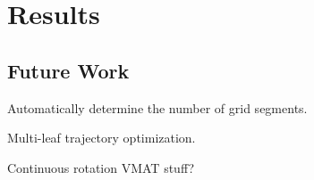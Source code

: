 \section{Results}


\subsection{Future Work}

Automatically determine the number of grid segments.

Multi-leaf trajectory optimization.

Continuous rotation VMAT stuff?
